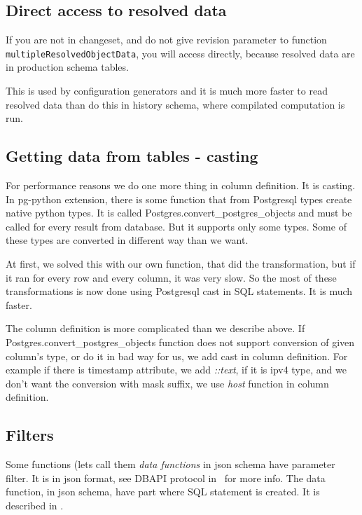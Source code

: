 \documentclass[deska]{subfiles}
\begin{document}
\subsection{Direct access to resolved data}
If you are not in changeset, and do not give revision parameter to function {\tt multipleResolvedObjectData},
you will access directly, because resolved data are in production schema tables.

This is used by configuration generators and it is much more faster to read
resolved data than do this in history schema, where compilated computation is run.

\subsection{Getting data from tables - casting}
\label{sec:cast}
For performance reasons we do one more thing in column definition. It is casting.
In pg-python extension, there is some function that from Postgresql types create native python types.
It is called Postgres.convert\_postgres\_objects
and must be called for every result from database. But it supports only some types.
Some of these types are converted in different way than we want.

At first, we solved this with our own function, that did the transformation, but if it ran for every
row and every column, it was very slow. So the most of these transformations is now done using Postgresql cast
in SQL statements. It is much faster.

The column definition is more complicated than we describe above. If
Postgres.convert\_postgres\_objects function 
does not support conversion of given column's type, or do it in bad way for us, we add cast in column definition.
For example if there is timestamp attribute, we add {\em ::text}, if it is ipv4 type, and we don't want
the conversion with mask suffix, we use {\em host} function in column definition.


\subsection{Filters}

Some functions (lets call them {\em data functions} in json schema have parameter filter. It is in json format,
see DBAPI protocol in~ for more info.
The data function, in json schema, have part where SQL statement is created. It is described in
.
\end{document}
